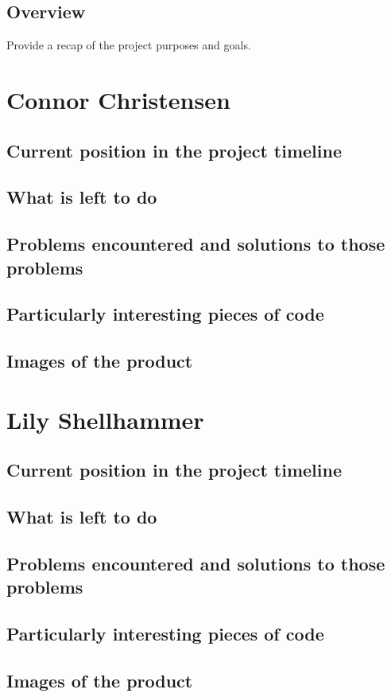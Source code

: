 \documentclass[draftclsnofoot,onecolumn,letterpaper,10pt,compsoc]{IEEEtran}
\begin{document}
\subsection{Overview}
Provide a recap of the project purposes and goals. \\

\section{Connor Christensen}
\subsection{Current position in the project timeline}
\subsection{What is left to do}
\subsection{Problems encountered and solutions to those problems}
\subsection{Particularly interesting pieces of code}
\subsection{Images of the product}
\section{Lily Shellhammer}
\subsection{Current position in the project timeline}
\subsection{What is left to do}
\subsection{Problems encountered and solutions to those problems}
\subsection{Particularly interesting pieces of code}
\subsection{Images of the product}
\end{document}
